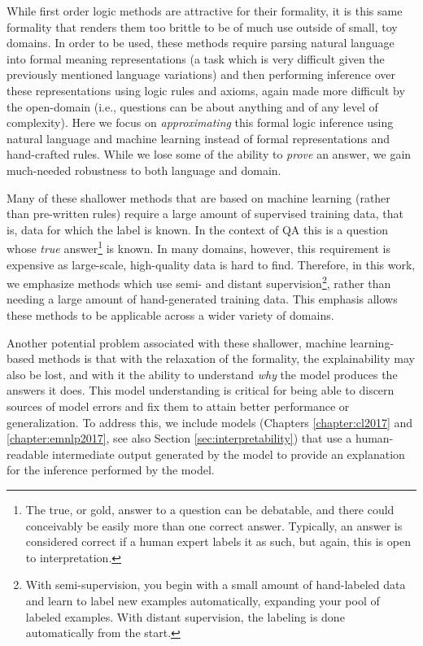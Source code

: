 While first order logic methods are attractive for their formality, it is this same formality that renders them too brittle to be of much use outside of small, toy domains.  In order to be used, these methods require parsing natural language into formal meaning representations (a task which is very difficult given the previously mentioned language variations) and then performing inference over these representations using logic rules and axioms, again made more difficult by the open-domain (i.e., questions can be about anything and of any level of complexity).  Here we focus on \emph{approximating} this formal logic inference using natural language and machine learning instead of formal representations and hand-crafted rules.  While we lose some of the ability to \emph{prove} an answer, we gain much-needed robustness to both language and domain.

Many of these shallower methods that are based on machine learning  (rather than pre-written rules) require a large amount of supervised training data, that is, data for which the label is known.  In the context of QA this is a question whose \emph{true} answer\footnote{The true, or gold, answer to a question can be debatable, and there could conceivably be easily more than one correct answer.  Typically, an answer is considered correct if a human expert labels it as such, but again, this is open to interpretation.} is known. In many domains, however, this requirement is expensive as large-scale, high-quality data is hard to find.  Therefore, in this work, we emphasize methods which use semi- and distant supervision\footnote{With semi-supervision, you begin with a small amount of hand-labeled data and learn to label new examples automatically, expanding your pool of labeled examples.  With distant supervision, the labeling is done automatically from the start.}, rather than needing a large amount of hand-generated training data.  This emphasis allows these methods to be applicable across a wider variety of domains.   

Another potential problem associated with these shallower, machine learning-based methods is that with the relaxation of the formality, the explainability may also be lost, and with it the ability to understand \emph{why} the model produces the answers it does.  This model understanding is critical for being able to discern sources of model errors and fix them to attain better performance or generalization. 
To address this, we include models (Chapters \ref{chapter:cl2017} and \ref{chapter:emnlp2017}, see also Section \ref{sec:interpretability}) that use a human-readable intermediate output generated by the model to provide an explanation for the inference performed by the model.

